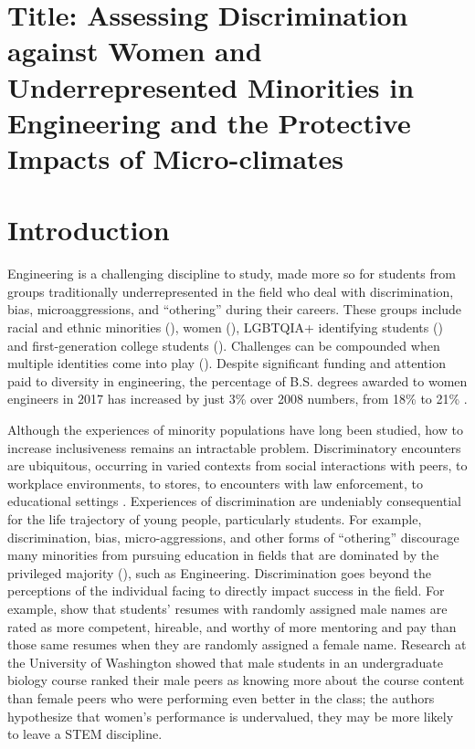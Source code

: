 \section{Title: Assessing Discrimination against Women and Underrepresented Minorities in Engineering and the Protective Impacts of Micro-climates}
\section{Introduction}
\label{sec:intro}

 
Engineering is a challenging discipline to study, made more so for students from groups traditionally underrepresented in the field who deal with discrimination, bias, microaggressions, and “othering” during their careers. These groups include racial and ethnic minorities (\eg \cite{Mcgee:2011}), women (\eg \cite{Moss-Racusin:2012}), LGBTQIA+ identifying students (\eg \cite{Cech:2011}) and first-generation college students (\eg \cite{Pascarella:2004,Carrigan, et al., 2019}). Challenges can be compounded when multiple identities come into play (\eg \citep{Williams:2014}). Despite significant funding and attention paid to diversity in engineering, the percentage of B.S. degrees awarded to women engineers in 2017 has increased by just 3\% over 2008 numbers, from 18\% to 21\% \citep{yoder2012engineering}. 

 
Although the experiences of minority populations have long been studied, how to increase inclusiveness remains an intractable problem. Discriminatory encounters are ubiquitous, occurring in varied contexts from social interactions with peers, to workplace environments, to stores, to encounters with law enforcement, to educational settings \cite{Fisher:2000}. Experiences of discrimination are undeniably consequential for the life trajectory of young people, particularly students. For example, discrimination, bias, micro-aggressions, and other forms of ``othering'' discourage many minorities from pursuing education in fields that are dominated by the privileged majority (\eg \cite{robinson2015racial}), such as Engineering. Discrimination goes beyond the perceptions of the individual facing to directly impact success in the field. For example, \citet{Moss-Racusin:2012} show that students' resumes with randomly assigned male names are rated as more competent, hireable, and worthy of more mentoring and pay than those same resumes when they are randomly assigned a female name. Research at the University of Washington showed that male students in an undergraduate biology course ranked their male peers as knowing more about the course content than female peers who were performing even better in the class; the authors hypothesize that women's performance is undervalued, they may be more likely to leave a STEM discipline\citep{Grunspan:2016}.

